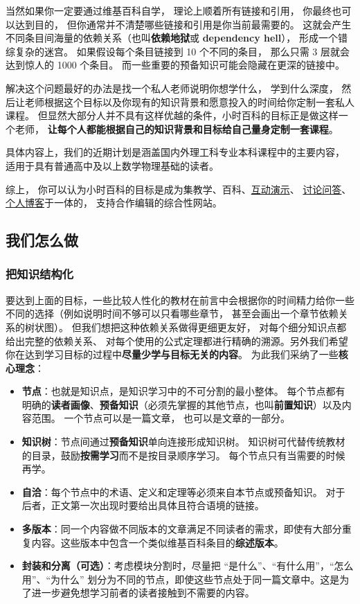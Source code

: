 当然如果你一定要通过维基百科自学， 理论上顺着所有链接和引用， 你最终也可以达到目的， 但你通常并不清楚哪些链接和引用是你当前最需要的。 这就会产生不同条目间海量的依赖关系（也叫\textbf{依赖地狱}或 \textbf{dependency hell}）， 形成一个错综复杂的迷宫。 如果假设每个条目链接到 10 个不同的条目， 那么只需 3 层就会达到惊人的 1000 个条目。 而一些重要的预备知识可能会隐藏在更深的链接中。

解决这个问题最好的办法是找一个私人老师说明你想学什么， 学到什么深度， 然后让老师根据这个目标以及你现有的知识背景和愿意投入的时间给你定制一套私人课程。 但显然大部分人并不具有这样优越的条件，小时百科的目标正是做这样一个老师， \textbf{让每个人都能根据自己的知识背景和目标给自己量身定制一套课程}。

具体内容上，我们的近期计划是涵盖国内外理工科专业本科课程中的主要内容， 适用于具有普通高中及以上数学物理基础的读者。

综上， 你可以认为小时百科的目标是成为集教学、百科、\href{http://wuli.wiki/apps}{互动演示}、 \href{http://wuli.wiki/forum}{讨论问答}、 \href{http://wuli.wiki/note}{个人博客}于一体的， 支持合作编辑的综合性网站。

\subsection{我们怎么做}

\subsubsection{把知识结构化}
要达到上面的目标，一些比较人性化的教材在前言中会根据你的时间精力给你一些不同的选择（例如说明时间不够可以只看哪些章节， 甚至会画出一个章节依赖关系的树状图）。 但我们想把这种依赖关系做得更细更友好， 对每个细分知识点都给出完整的依赖关系、 对每个使用的公式定理都进行精确的溯源。另外我们希望你在达到学习目标的过程中\textbf{尽量少学与目标无关的内容}。 为此我们采纳了一些\textbf{核心理念}：
\begin{itemize}
\item \textbf{节点}：也就是知识点，是知识学习中的不可分割的最小整体。 每个节点都有明确的\textbf{读者画像}、\textbf{预备知识}（必须先掌握的其他节点，也叫\textbf{前置知识}）以及内容范围。 一个节点可以是一篇文章， 也可以是文章的一部分。
\item \textbf{知识树}：节点间通过\textbf{预备知识}单向连接形成知识树。 知识树可代替传统教材的目录，鼓励\textbf{按需学习}而不是按目录顺序学习。 每个节点只有当需要的时候再学。
\item \textbf{自洽}：每个节点中的术语、定义和定理等必须来自本节点或预备知识。 对于后者，正文第一次出现时要给出具体且符合语境的链接。
\item \textbf{多版本}：同一个内容做不同版本的文章满足不同读者的需求，即使有大部分重复内容。这些版本中包含一个类似维基百科条目的\textbf{综述版本}。
\item \textbf{封装和分离（可选）}：考虑模块分割时，尽量把 “是什么”、“有什么用”，“怎么用”、“为什么” 划分为不同的节点，即使这些节点处于同一篇文章中。这是为了进一步避免想学习前者的读者接触到不需要的内容。
\end{itemize}

